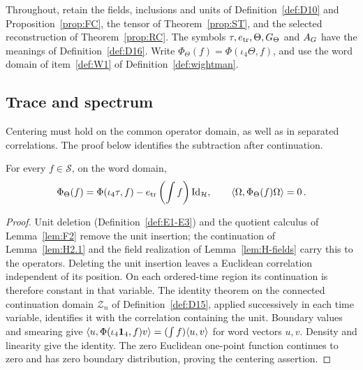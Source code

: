 Throughout, retain the fields, inclusions and units of Definition~\ref{def:D10} and Proposition~\ref{prop:FC}, the tensor of Theorem~\ref{prop:ST}, and the selected reconstruction of Theorem~\ref{prop:RC}. The symbols $\tau,e_{\rm tr},\Theta,G_{\Theta}$ and $A_G$ have the meanings of Definition~\ref{def:D16}. Write $\Phi_\Theta(f)=\Phi(\iota_4\Theta,f)$, and use the word domain of item~\ref{def:W1} of Definition~\ref{def:wightman}.

\subsection{Trace and spectrum}\label{sec:partII-I.1}

Centering must hold on the common operator domain, as well as in separated correlations. The proof below identifies the subtraction after continuation.
\begin{lemma}\label{lem:I1.1}
For every $f\in\mathcal S$, on the word domain,
\begin{equation*}
\Phi_\Theta(f)=\Phi(\iota_4\tau,f)-e_{\rm tr}\left(\int f\right)\mathrm{Id}_{\mathcal H},
\qquad \langle\Omega,\Phi_\Theta(f)\Omega\rangle=0\,.
\end{equation*}
\end{lemma}
\begin{proof}
Unit deletion (Definition~\ref{def:E1-E3}) and the quotient calculus of Lemma~\ref{lem:F2} remove the unit insertion; the continuation of Lemma~\ref{lem:H2.1} and the field realization of Lemma~\ref{lem:H-fields} carry this to the operators. Deleting the unit insertion leaves a Euclidean correlation independent of its position. On each ordered-time region its continuation is therefore constant in that variable. The identity theorem on the connected continuation domain $\mathcal Z_n$ of Definition~\ref{def:D15}, applied successively in each time variable, identifies it with the correlation containing the unit. Boundary values and smearing give $\langle u,\Phi(\iota_4\mathbf{1}_{4},f)v\rangle=(\int f)\langle u,v\rangle$ for word vectors $u,v$. Density and linearity give the identity. The zero Euclidean one-point function continues to zero and has zero boundary distribution, proving the centering assertion.
\end{proof}

